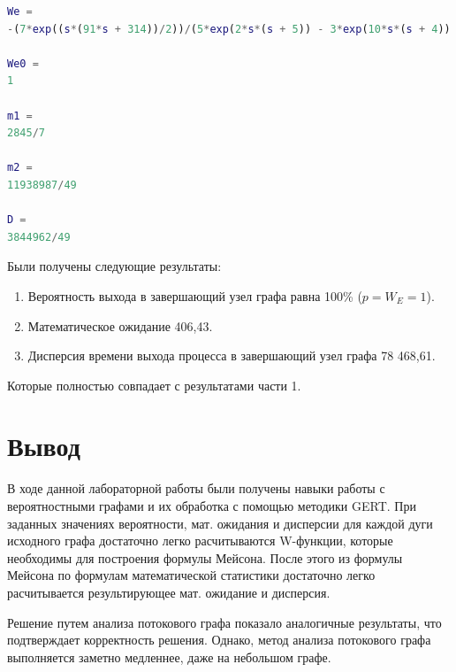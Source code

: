 \documentclass[14pt,a4paper,report]{report}
\begin{document}
\begin{lstlisting}[language={matlab}, caption={Результат}, basicstyle=\ttfamily]
We =
-(7*exp((s*(91*s + 314))/2))/(5*exp(2*s*(s + 5)) - 3*exp(10*s*(s + 4)) + 30*exp(2*s*(4*s + 15)) - exp((3*s*(15*s + 52))/2) + 10*exp((s*(41*s + 136))/2) + 2*exp((s*(91*s + 314))/2) - 50)
 
We0 =
1
 
m1 =
2845/7
 
m2 =
11938987/49
 
D =
3844962/49
\end{lstlisting}
Были получены следующие результаты:
\begin{enumerate}
\item Вероятность выхода в завершающий узел графа равна 100\% ($p=W_E=1$).
\item Математическое ожидание 406,43.
\item Дисперсия времени выхода процесса в завершающий узел графа 78 468,61.
\end{enumerate}
Которые полностью совпадает с результатами части 1.



\section{Вывод}

В ходе данной лабораторной работы были получены навыки работы с вероятностными графами и их обработка с помощью методики GERT. При заданных значениях вероятности, мат. ожидания и дисперсии для каждой дуги исходного графа достаточно легко расчитываются W-функции, которые необходимы для построения формулы Мейсона. После этого из формулы Мейсона по формулам математической статистики достаточно легко расчитывается результирующее мат. ожидание и дисперсия.

Решение путем анализа потокового графа показало аналогичные результаты, что подтверждает корректность решения. Однако, метод анализа потокового графа выполняется заметно медленнее, даже на небольшом графе.
\end{document}
